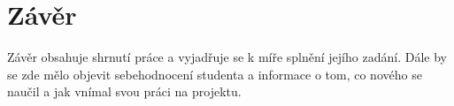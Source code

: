 \documentclass[11pt,a4paper,twoside,openright]{report}
\let\openright=\cleardoublepage
\begin{document}
\chapter*{Závěr}
\pagestyle{empty}

Závěr obsahuje shrnutí práce a vyjadřuje se k míře splnění jejího zadání. Dále by se zde mělo objevit sebehodnocení studenta a informace o tom, co nového se naučil a jak vnímal svou práci na projektu.


\nocite{einstein}\nocite{maly}\nocite{knuthwebsite}\nocite{ucebnice}\nocite{polovodicovatechnika}\nocite{šrait}
\printbibliography[title={Seznam použité literatury},heading={bibintoc}]

\openright
\listoffigures
{}

\clearpage
\listoftables
{}


\end{document}
